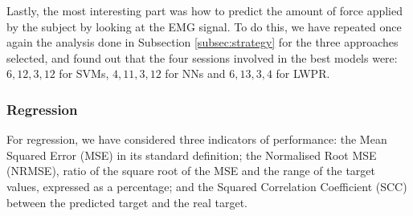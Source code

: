 Lastly, the most interesting part was how to predict the amount of
force applied by the subject by looking at the EMG signal. To do this,
we have repeated once again the analysis done in Subsection
\ref{subsec:strategy} for the three approaches selected, and found out
that the four sessions involved in the best models were: $6,12,3,12$
for SVMs, $4,11,3,12$ for NNs and $6,13,3,4$ for LWPR.

\subsubsection{Regression}

For regression, we have considered three indicators of performance:
the Mean Squared Error (MSE) in its standard definition; the
Normalised Root MSE (NRMSE), ratio of the square root of the MSE and
the range of the target values, expressed as a percentage; and the
Squared Correlation Coefficient (SCC) between the predicted target and
the real target.

